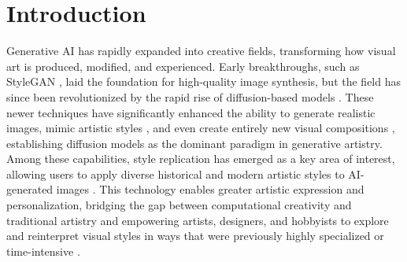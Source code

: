 \documentclass[sn-mathphys]{sn-jnl}
\begin{document}

\maketitle

\section{Introduction}
Generative AI has rapidly expanded into creative fields, transforming how visual art is produced, modified, and experienced. Early breakthroughs, such as StyleGAN \cite{StyleGAN2,StyleGAN-T}, laid the foundation for high-quality image synthesis, but the field has since been revolutionized by the rapid rise of diffusion-based models \cite{DDPM,DDIM,stable-diffusion}. These newer techniques have significantly enhanced the ability to generate realistic images, mimic artistic styles \cite{SGMD,ArtBank}, and even create entirely new visual compositions \cite{Dalle2,Imagen}, establishing diffusion models as the dominant paradigm in generative artistry. Among these capabilities, style replication has emerged as a key area of interest, allowing users to apply diverse historical and modern artistic styles to AI-generated images \cite{FeaST,Style_injection,Step-aware}. This technology enables greater artistic expression and personalization, bridging the gap between computational creativity and traditional artistry and empowering artists, designers, and hobbyists to explore and reinterpret visual styles in ways that were previously highly specialized or time-intensive \cite{designing-barros,GameDesign,inspiring-Haase,craft-edu}.

\end{document}
